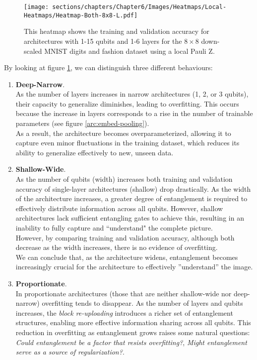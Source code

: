 
\begin{figure}[bp]
    \centering
    \texttt{[image: sections/chapters/Chapter6/Images/Heatmaps/Local-Heatmaps/Heatmap-Both-8x8-L.pdf]}
    \caption{This heatmap shows the training and validation accuracy for architectures with 1-15 qubits and
    1-6 layers for the $8\times8$ down-scaled MNIST digits and fashion dataset using a local Pauli Z.}
    \label{fig:heatmap-8x8-L}
\end{figure}
By looking at figure \ref{fig:heatmap-8x8-L}, we can distinguish 
three different behaviours:

\begin{enumerate}
    \item \textbf{Deep-Narrow}.\\
    As the number of layers increases in narrow architectures (1, 2, or 3 qubits), their capacity to 
    generalize diminishes, leading to overfitting. This occurs because the increase in layers corresponds 
    to a rise in the number of trainable parameters (see figure \ref{arc:embed-pooling}).\\
    As a result, the architecture becomes overparameterized, allowing it to capture even minor 
    fluctuations in the training dataset, which reduces its ability to generalize effectively to new, 
    unseen data.
    \item \textbf{Shallow-Wide}.\\
    As the number of qubits (width) increases both training and validation accuracy of 
    single-layer architectures (shallow) drop drastically.
    As the width of the architecture increases, a greater degree of entanglement is required to 
    effectively distribute information across all qubits. However, shallow architectures lack 
    sufficient entangling gates to achieve this, resulting in an inability to fully capture and 
    “understand" the complete picture.\\
    However, by comparing training and validation accuracy, although both decrease as 
    the width increases, there is no evidence of overfitting.\\
    We can conclude that, as the architecture widens, entanglement becomes increasingly crucial for the 
    architecture to effectively ”understand” the image.
    \item \textbf{Proportionate}.\\
    In proportionate architectures (those that are neither shallow-wide nor deep-narrow) overfitting 
    tends to disappear. As the number of layers and qubits increases, the \textit{block re-uploading} 
    introduces a richer set of entanglement structures, enabling more effective information sharing 
    across all qubits. This reduction in overfitting as entanglement grows raises some natural questions:
    \textit{Could entanglement be a factor that resists overfitting?}, 
    \textit{Might entanglement serve as a source of regularization?}.
\end{enumerate}

